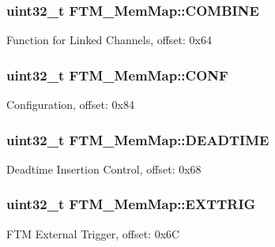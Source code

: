 \subsubsection[{C\+O\+M\+B\+I\+N\+E}]{\setlength{\rightskip}{0pt plus 5cm}uint32\+\_\+t F\+T\+M\+\_\+\+Mem\+Map\+::\+C\+O\+M\+B\+I\+N\+E}\label{struct_f_t_m___mem_map_ab00737276f6086e805d6d7c892608100}
Function for Linked Channels, offset\+: 0x64 \hypertarget{struct_f_t_m___mem_map_a7b48a7fbd1a47ba72e009b9d82b89cf6}{}
\subsubsection[{C\+O\+N\+F}]{\setlength{\rightskip}{0pt plus 5cm}uint32\+\_\+t F\+T\+M\+\_\+\+Mem\+Map\+::\+C\+O\+N\+F}\label{struct_f_t_m___mem_map_a7b48a7fbd1a47ba72e009b9d82b89cf6}
Configuration, offset\+: 0x84 \hypertarget{struct_f_t_m___mem_map_a7a7e6e572834de5c95fc5279659e582c}{}
\subsubsection[{D\+E\+A\+D\+T\+I\+M\+E}]{\setlength{\rightskip}{0pt plus 5cm}uint32\+\_\+t F\+T\+M\+\_\+\+Mem\+Map\+::\+D\+E\+A\+D\+T\+I\+M\+E}\label{struct_f_t_m___mem_map_a7a7e6e572834de5c95fc5279659e582c}
Deadtime Insertion Control, offset\+: 0x68 \hypertarget{struct_f_t_m___mem_map_afe00dccf260f10c5172a9cae5fb72d69}{}
\subsubsection[{E\+X\+T\+T\+R\+I\+G}]{\setlength{\rightskip}{0pt plus 5cm}uint32\+\_\+t F\+T\+M\+\_\+\+Mem\+Map\+::\+E\+X\+T\+T\+R\+I\+G}\label{struct_f_t_m___mem_map_afe00dccf260f10c5172a9cae5fb72d69}
F\+T\+M External Trigger, offset\+: 0x6\+C \hypertarget{struct_f_t_m___mem_map_af3c88a62b68d6b62793ce078ae72d31b}{}
